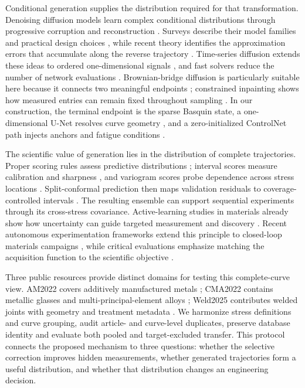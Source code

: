\documentclass[a4paper,fleqn]{cas-dc}
\begin{document}
Conditional generation supplies the distribution required for that transformation. Denoising diffusion models learn complex conditional distributions through progressive corruption and reconstruction \cite{Ho2020DDPM}. Surveys describe their model families and practical design choices \cite{Yang2023DiffusionSurvey,Cao2024DiffusionSurvey}, while recent theory identifies the approximation errors that accumulate along the reverse trajectory \cite{Chang2024DiffusionTheory,Pierret2025DiffusionErrors}. Time-series diffusion extends these ideas to ordered one-dimensional signals \cite{Lin2024TimeSeriesDiffusion,Yang2026TimeSeriesSurvey}, and fast solvers reduce the number of network evaluations \cite{Lu2022DPMSolver}. Brownian-bridge diffusion is particularly suitable here because it connects two meaningful endpoints \cite{Li2023BBDM}; constrained inpainting shows how measured entries can remain fixed throughout sampling \cite{Lugmayr2022RePaint}. In our construction, the terminal endpoint is the sparse Basquin state, a one-dimensional U-Net resolves curve geometry \cite{Ronneberger2015UNet}, and a zero-initialized ControlNet path injects anchors and fatigue conditions \cite{Zhang2023ControlNet}.

The scientific value of generation lies in the distribution of complete trajectories. Proper scoring rules assess predictive distributions \cite{Gneiting2007Scoring}; interval scores measure calibration and sharpness \cite{Bracher2021IntervalScore}, and variogram scores probe dependence across stress locations \cite{Scheuerer2015VariogramScore}. Split-conformal prediction then maps validation residuals to coverage-controlled intervals \cite{Lei2018Conformal}. The resulting ensemble can support sequential experiments through its cross-stress covariance. Active-learning studies in materials already show how uncertainty can guide targeted measurement and discovery \cite{Lookman2019ActiveLearning,Balachandran2016ActiveMaterials}. Recent autonomous experimentation frameworks extend this principle to closed-loop materials campaigns \cite{Kusne2022ActiveLearning}, while critical evaluations emphasize matching the acquisition function to the scientific objective \cite{Liu2026ActiveLearningCritique}.

Three public resources provide distinct domains for testing this complete-curve view. AM2022 covers additively manufactured metals \cite{Zhang2023FatigueData}; CMA2022 contains metallic glasses and multi-principal-element alloys \cite{Zhang2023CMA}; Weld2025 contributes welded joints with geometry and treatment metadata \cite{Deng2025Welded}. We harmonize stress definitions and curve grouping, audit article- and curve-level duplicates, preserve database identity and evaluate both pooled and target-excluded transfer. This protocol connects the proposed mechanism to three questions: whether the selective correction improves hidden measurements, whether generated trajectories form a useful distribution, and whether that distribution changes an engineering decision.
\end{document}
